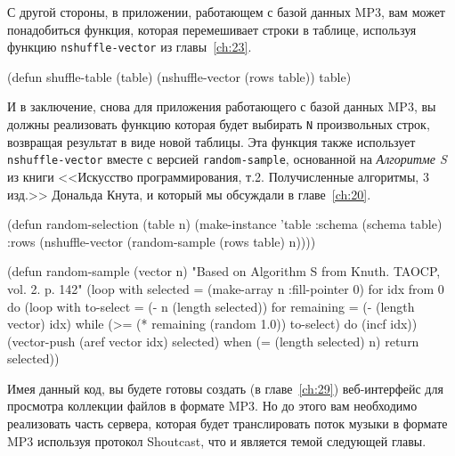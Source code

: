 С другой стороны, в приложении, работающем с базой данных MP3, вам может понадобиться
функция, которая перемешивает строки в таблице, используя функцию \lstinline{nshuffle-vector}
из главы~\ref{ch:23}.

\begin{myverb}
(defun shuffle-table (table)
  (nshuffle-vector (rows table))
  table)
\end{myverb}

И в заключение, снова для приложения работающего с базой данных MP3, вы должны реализовать
функцию которая будет выбирать \lstinline{N} произвольных строк, возвращая результат в виде
новой таблицы.  Эта функция также использует \lstinline{nshuffle-vector} вместе с версией
\lstinline{random-sample}, основанной на \textit{Алгоритме S} из книги <<Искусство
программирования, т.2.  Получисленные алгоритмы, 3 изд.>> Дональда Кнута, и который мы
обсуждали в главе~\ref{ch:20}.

\begin{myverb}
(defun random-selection (table n)
  (make-instance
   'table
   :schema (schema table)
   :rows (nshuffle-vector (random-sample (rows table) n))))

(defun random-sample (vector n)
  "Based on Algorithm S from Knuth. TAOCP, vol. 2. p. 142"
  (loop with selected = (make-array n :fill-pointer 0)
     for idx from 0
     do
       (loop
          with to-select = (- n (length selected))
          for remaining = (- (length vector) idx)
          while (>= (* remaining (random 1.0)) to-select)
          do (incf idx))
       (vector-push (aref vector idx) selected)
     when (= (length selected) n) return selected))
\end{myverb}

Имея данный код, вы будете готовы создать (в главе~\ref{ch:29}) веб-интерфейс для
просмотра коллекции файлов в формате MP3.  Но до этого вам необходимо реализовать часть
сервера, которая будет транслировать поток музыки в формате MP3 используя протокол
Shoutcast, что и является темой следующей главы.

